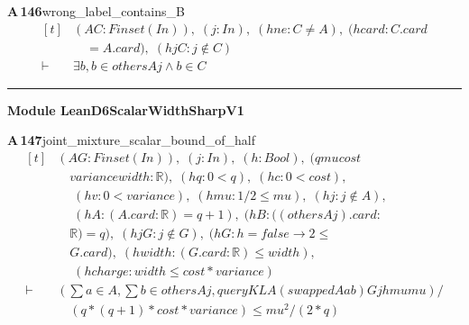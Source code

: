 \documentclass[conference]{IEEEtran}
\theoremstyle{definition}
\newcommand{\lean}[1]{\textsf{\footnotesize #1}}
\begin{document}
\noindent\textbf{A\,146}\quad\lean{wrong\_label\_contains\_B}
{\footnotesize\[ \begin{aligned}[t]
&(\mathit{A} \mathit{C} : \mathit{Finset} (\mathit{I} \mathit{n})),\; (\mathit{j} : \mathit{I} \mathit{n}),\; (\mathit{hne} : \mathit{C} \neq \mathit{A}),\; (\mathit{hcard} : \mathit{C}.\mathit{card}\\
&\quad =\mathit{A}.\mathit{card}),\; (\mathit{hjC} : \mathit{j} \notin \mathit{C})\\
\vdash\;&\exists \mathit{b},\mathit{b} \in \mathit{others} \mathit{A} \mathit{j} \wedge \mathit{b} \in \mathit{C}
\end{aligned} \]}

\vspace{4pt}\noindent\rule{\columnwidth}{0.4pt}\par\vspace{2pt}
\noindent\textbf{Module \lean{LeanD6ScalarWidthSharpV1}}\par\vspace{3pt}

\noindent\textbf{A\,147}\quad\lean{joint\_mixture\_scalar\_bound\_of\_half}
{\footnotesize\[ \begin{aligned}[t]
&(\mathit{A} \mathit{G} : \mathit{Finset} (\mathit{I} \mathit{n})),\; (\mathit{j} : \mathit{I} \mathit{n}),\; (\mathit{h} : \mathit{Bool}),\; (\mathit{q} \mathit{mu} \mathit{cost}\\
&\quad \mathit{variance} \mathit{width} : \mathbb{R} ),\; (\mathit{hq} : 0<\mathit{q}),\; (\mathit{hc} : 0<\mathit{cost}),\\
&\quad \; (\mathit{hv} : 0<\mathit{variance}),\; (\mathit{hmu} : 1/2 \leq \mathit{mu}),\; (\mathit{hj} : \mathit{j} \notin \mathit{A}),\\
&\quad \; (\mathit{hA} : (\mathit{A}.\mathit{card}:\mathbb{R} )=\mathit{q}+1),\; (\mathit{hB} : ((\mathit{others} \mathit{A} \mathit{j}).\mathit{card}:\\
&\quad \mathbb{R} )=\mathit{q}),\; (\mathit{hjG} : \mathit{j} \notin \mathit{G}),\; (\mathit{hG} : \mathit{h}=\mathit{false} \to 2 \leq\\
&\quad \mathit{G}.\mathit{card}),\; (\mathit{hwidth} : (\mathit{G}.\mathit{card}:\mathbb{R} ) \leq \mathit{width}),\\
&\quad \; (\mathit{hcharge} : \mathit{width} \leq \mathit{cost}*\mathit{variance})\\
\vdash\;&(\textstyle\sum \mathit{a} \in \mathit{A},\textstyle\sum \mathit{b} \in \mathit{others} \mathit{A} \mathit{j},\mathit{queryKL} \mathit{A} (\mathit{swapped} \mathit{A} \mathit{a} \mathit{b}) \mathit{G} \mathit{j} \mathit{h} \mathit{mu} \mathit{mu})/\\
&\quad (\mathit{q}*(\mathit{q}+1)*\mathit{cost}*\mathit{variance}) \leq \mathit{mu}^{2}/(2*\mathit{q})
\end{aligned} \]}
\end{document}

